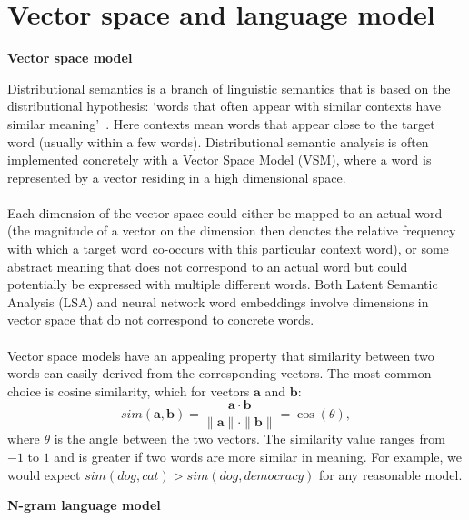 \documentclass[a4paper,12pt,twoside,openright]{report}
\newcommand{\tb}{\vspace{10pt} \textbf}
\newcommand{\nl}{\\ \\}
\begin{document}
\section{Vector space and language model}

\tb{Vector space model}

Distributional semantics is a branch of linguistic semantics that is based on the distributional hypothesis: `words that often appear with similar contexts have similar meaning'~\cite{harris54}. Here contexts mean words that appear close to the target word (usually within a few words). Distributional semantic analysis is often implemented concretely with a Vector Space Model (VSM), where a word is represented by a vector residing in a high dimensional space. 
\nl
Each dimension of the vector space could either be mapped to an actual word (the magnitude of a vector on the dimension then denotes the relative frequency with which a target word co-occurs with this particular context word), or some abstract meaning that does not correspond to an actual word but could potentially be expressed with multiple different words. Both Latent Semantic Analysis (LSA) and neural network word embeddings involve dimensions in vector space that do not correspond to concrete words. 
\nl
Vector space models have an appealing property that similarity between two words can easily derived from the corresponding vectors. The most common choice is cosine similarity, which for vectors $\mathbf{a}$ and $\mathbf{b}$:
$$ {sim}(\mathbf{a},\mathbf{b}) = \frac{\mathbf{a}\cdot\mathbf{b}}{\|\mathbf{a}\| \cdot \|\mathbf{b}\|} = \cos(\theta),$$
where $\theta$ is the angle between the two vectors. The similarity value ranges from $-1$ to $1$ and is greater if two words are more similar in meaning. For example, we would expect $sim(dog,cat)>sim(dog,democracy)$ for any reasonable model.

\tb{N-gram language model}
\end{document}
